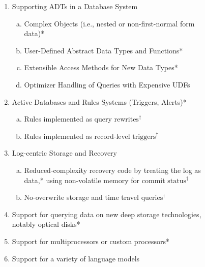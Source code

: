 \documentclass[sigconf,natbib=false]{acmart}
\begin{document}
\begin{figure}[t]
\begin{mdframed}
\small
\begin{enumerate}[1. ]

\item Supporting ADTs in a Database System

\begin{enumerate}[a.]

\item Complex Objects (i.e., nested or non-first-normal form data)*

\item User-Defined Abstract Data Types and Functions*

\item Extensible Access Methods for New Data Types*

\item Optimizer Handling of Queries with Expensive UDFs

\end{enumerate}
\item Active Databases and Rules Systems (Triggers, Alerts)*

\begin{enumerate}[a.]

\item Rules implemented as query $\mbox{rewrites}^\dagger$

\item Rules implemented as record-level $\mbox{triggers}^\dagger$

\end{enumerate}
\item Log-centric Storage and Recovery

\begin{enumerate}[a.]

\item Reduced-complexity recovery code by treating the log as data,* using non-volatile memory for commit $\mbox{status}^\dagger$

\item No-overwrite storage and time travel $\mbox{queries}^\dagger$

\end{enumerate}
\item Support for querying data on new deep storage technologies, notably optical disks*

\item Support for multiprocessors or custom processors*

\item Support for a variety of language models


\end{enumerate}
\end{mdframed}
\end{figure}
\end{document}

